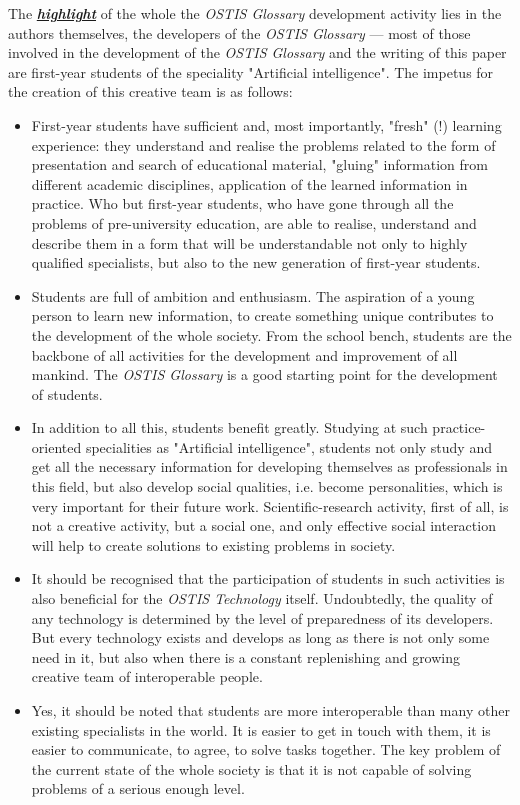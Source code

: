\documentclass[10pt,a4paper]{article}
\begin{document}
\begin{multicols}{2}
\begin{spacing}{1.05}
The \textbf{\textit{\underline{highlight}}} of the whole the \textit{OSTIS Glossary} development activity lies in the authors themselves, the developers of the \textit{OSTIS Glossary} — most of those involved in the development of the \textit{OSTIS Glossary} and the writing of this paper are first-year students of the speciality "Artificial intelligence". The impetus for the creation of this creative team is as follows:
\begin{itemize}
\item First-year students have sufficient and, most importantly, "fresh" (!) learning experience: they understand and realise the problems related to the form of presentation and search of educational material, "gluing" information from different academic disciplines, application of the learned information in practice. Who but first-year students, who have gone through all the problems of pre-university education, are able to realise, understand and describe them in a form that will be understandable not only to highly qualified specialists, but also to the new generation of first-year students.
\item Students are full of ambition and enthusiasm. The aspiration of a young person to learn new information, to create something unique contributes to the development of the whole society. From the school bench, students are the backbone of all activities for the development and improvement of all mankind. The \textit{OSTIS Glossary} is a good starting point for the development of students.
\item In addition to all this, students benefit greatly. Studying at such practice-oriented specialities as "Artificial intelligence", students not only study and get all the necessary information for developing themselves as professionals in this field, but also develop social qualities, i.e. become personalities, which is very important for their future work. Scientific-research activity, first of all, is not a creative activity, but a social one, and only effective social interaction will help to create solutions to existing problems in society.
\item It should be recognised that the participation of students in such activities is also beneficial for the \textit{OSTIS Technology} itself. Undoubtedly, the quality of any technology is determined by the level of preparedness of its developers. But every technology exists and develops as long as there is not only some need in it, but also when there is a constant replenishing and growing creative team of interoperable people.
\item Yes, it should be noted that students are more interoperable than many other existing specialists in the world. It is easier to get in touch with them, it
\newpage
is easier to communicate, to agree, to solve tasks together. The key problem of the current state of the whole society is that it is not capable of solving problems of a serious enough level.
\end{itemize}
\end{spacing}


\end{multicols}
\end{document}
